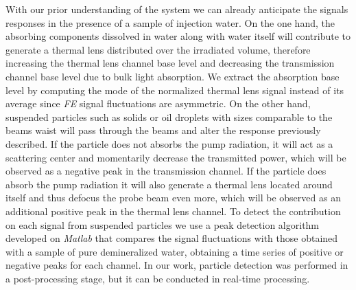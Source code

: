\documentclass[9pt,twocolumn,twoside]{osajnl}
\newcommand{\FE}{\textit{FE}}
\begin{document}
With our prior understanding of the system we can already anticipate the signals responses in the presence of a sample of injection water. On the one hand, the absorbing components dissolved in water along with water itself will contribute to generate a thermal lens distributed over the irradiated volume, therefore increasing the thermal lens channel base level and decreasing the transmission channel base level due to bulk light absorption. We extract the absorption base level by computing the mode of the normalized thermal lens signal instead of its average since \FE{} signal fluctuations are asymmetric. On the other hand, suspended particles such as solids or oil droplets with sizes comparable to the beams waist will pass through the beams and alter the response previously described. If the particle does not absorbs the pump radiation, it will act as a scattering center and momentarily decrease the transmitted power, which will be observed as a negative peak in the transmission channel. If the particle does absorb the pump radiation it will also generate a thermal lens located around itself and thus defocus the probe beam even more, which will be observed as an additional positive peak in the thermal lens channel. To detect the contribution on each signal from suspended particles we use a peak detection algorithm developed on \emph{Matlab} that compares the signal fluctuations with those obtained with a sample of pure demineralized water, obtaining a time series of positive or negative peaks for each channel. In our work, particle detection was performed in a post-processing stage, but it can be conducted in real-time processing.
\end{document}
